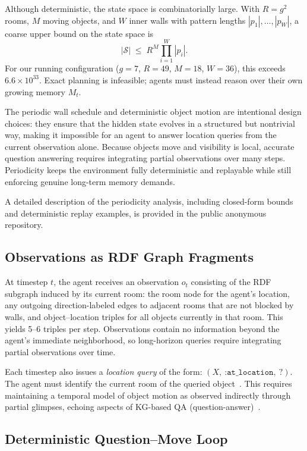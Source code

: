\documentclass[runningheads]{llncs}
\begin{document}
Although deterministic, the state space is combinatorially large. With
$R = g^2$ rooms, $M$ moving objects, and $W$ inner walls with pattern lengths
$|p_1|,\dots,|p_W|$, a coarse upper bound on the state space is
\[
  |\mathcal{S}| \;\le\; R^M \prod_{i=1}^{W} |p_i|.
\]
For our running configuration ($g{=}7$,
$R{=}49$, $M{=}18$, $W{=}36$), this exceeds $6.6\times 10^{33}$.
Exact planning is infeasible; agents must instead reason over their own growing memory $M_t$.

The periodic wall schedule and deterministic object motion are intentional
design choices: they ensure that the hidden state evolves in a structured but
nontrivial way, making it impossible for an agent to answer location queries
from the current observation alone. Because objects move and visibility is
local, accurate question answering requires integrating partial observations
over many steps. Periodicity keeps the environment fully deterministic and
replayable while still enforcing genuine long-term memory demands.

A detailed description of the periodicity analysis, including closed-form
bounds and deterministic replay examples, is provided in the public
anonymous repository.

\subsection{Observations as RDF Graph Fragments}

At timestep $t$, the agent receives an observation $o_t$ consisting of the RDF
subgraph induced by its current room: the room node for the agent’s location,
any outgoing direction-labeled edges to adjacent rooms that are not blocked by
walls, and object–location triples for all objects currently in that room. This
yields 5–6 triples per step. Observations contain no information
beyond the agent’s immediate neighborhood, so long-horizon queries require
integrating partial observations over time.


Each timestep also issues a \emph{location query} of the form: $(X,\ \texttt{:at\_location},\ ?)$.
The agent must identify the current room of the queried object~\cite{bordes2015largescalesimplequestionanswering}. This
requires maintaining a temporal model of object motion as observed
indirectly through partial glimpses, echoing aspects of KG-based QA (question-answer)~\cite{yih-etal-2015-semantic}.

\subsection{Deterministic Question–Move Loop}
\end{document}
